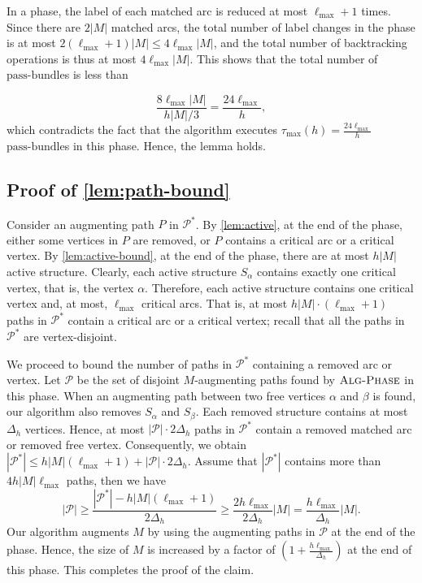 \documentclass{article}
\newcommand{\alp}{\alpha}
\newcommand{\lmax}{\ell_{\max}}
\newcommand{\taumax}{\tau_{\max}}
\newcommand{\calP}{\mathcal{P}}
\newcommand{\bundle}{\text{pass-bundle}\xspace}
\newcommand{\algPhase}{\textsc{Alg-Phase}\xspace}
\begin{document}
In a phase, the label of each matched arc is reduced at most $\lmax + 1$ times.
Since there are $2|M|$ matched arcs, the total number of label changes in the phase is at most $2 (\lmax + 1) |M| \leq 4 \lmax |M|$, and the total number of backtracking operations is thus at most $4 \lmax |M|$.
This shows that the total number of $\bundle$s is less than

\[ \frac{8 \lmax |M|}{h|M| / 3} = \frac{24 \lmax}{h}, \]
which contradicts the fact that the algorithm executes $\taumax(h) = \frac{24 \lmax}{h}$ $\bundle$s in this phase. Hence, the lemma holds.


\subsection{Proof of \cref{lem:path-bound}}
\label{sec:proof-path-bound}
Consider an augmenting path $P$ in $\calP^*$. By \cref{lem:active}, at the end of the phase, either some vertices in $P$ are removed, or $P$ contains a critical arc or a critical vertex.
By \cref{lem:active-bound}, at the end of the phase, there are at most $h|M|$ active structure.
Clearly, each active structure $S_\alp$ contains exactly one critical vertex, that is, the vertex $\alp$.
Therefore, each active structure contains one critical vertex and, at most, $\lmax$ critical arcs.
That is, at most $h|M| \cdot (\lmax + 1)$ paths in $\calP^*$ contain a critical arc or a critical vertex; recall that all the paths in $\calP^*$ are vertex-disjoint.

We proceed to bound the number of paths in $\calP^*$ containing a removed arc or vertex.
Let $\calP$ be the set of disjoint $M$-augmenting paths found by $\algPhase$ in this phase.
When an augmenting path between two free vertices $\alp$ and $\beta$ is found, our algorithm also removes $S_\alp$ and $S_\beta$.
Each removed structure contains at most $\Delta_h$ vertices.
Hence, at most $|\calP| \cdot 2\Delta_h$ paths in $\calP^*$ contain a removed matched arc or removed free vertex.
Consequently, we obtain $|\calP^*| \leq h|M|(\lmax + 1) + |\calP| \cdot 2\Delta_h$.
Assume that $|\calP^*|$ contains more than $4h|M|\lmax$ paths, then we have
\[
    |\calP|
    \geq \frac{|\calP^*| - h|M|(\lmax + 1)}{2\Delta_h}
    \geq \frac{2h\lmax}{2\Delta_h}|M|
    = \frac{h\lmax}{\Delta_h}|M|.
\]
Our algorithm augments $M$ by using the augmenting paths in $\calP$ at the end of the phase.
Hence, the size of $M$ is increased by a factor of $(1 + \frac{h\lmax}{\Delta_h})$ at the end of this phase.
This completes the proof of the claim.
\end{document}
